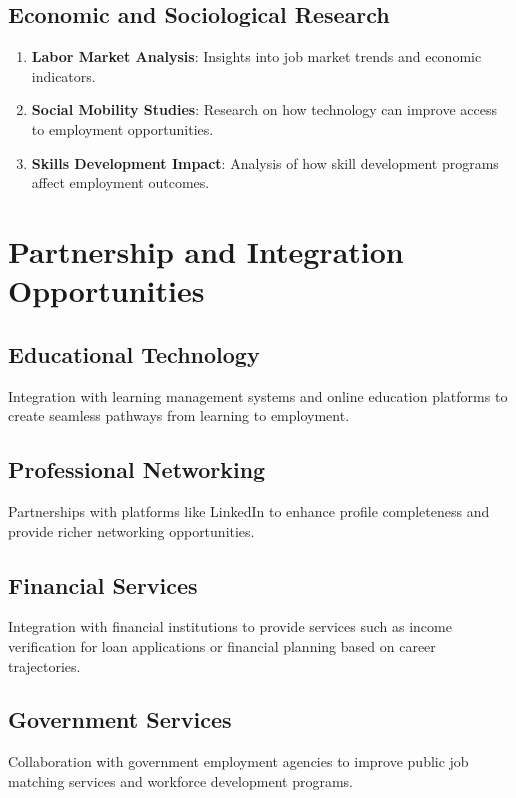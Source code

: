 \documentclass[12pt,a4paper]{report}
\begin{document}
\subsection*{Economic and Sociological Research}

\begin{enumerate}
    \item \textbf{Labor Market Analysis}: Insights into job market trends and economic indicators.
    \item \textbf{Social Mobility Studies}: Research on how technology can improve access to employment opportunities.
    \item \textbf{Skills Development Impact}: Analysis of how skill development programs affect employment outcomes.
\end{enumerate}

\section*{Partnership and Integration Opportunities}

\subsection*{Educational Technology}

Integration with learning management systems and online education platforms to create seamless pathways from learning to employment.

\subsection*{Professional Networking}

Partnerships with platforms like LinkedIn to enhance profile completeness and provide richer networking opportunities.

\subsection*{Financial Services}

Integration with financial institutions to provide services such as income verification for loan applications or financial planning based on career trajectories.

\subsection*{Government Services}

Collaboration with government employment agencies to improve public job matching services and workforce development programs.
\end{document}
